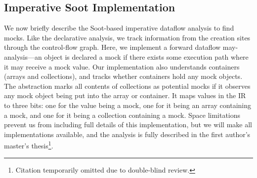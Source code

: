 \subsection{Imperative Soot Implementation}
\label{subsec:soot}
We now briefly describe the Soot-based imperative dataflow analysis to find mocks. Like the declarative analysis, we track information from the creation sites through the control-flow graph. Here, we implement a forward dataflow may-analysis---an object is declared a mock if there exists some execution path where it may receive a mock value. Our implementation also understands containers (arrays and collections), and tracks whether containers hold any mock objects. The abstraction marks all contents of collections as potential mocks if it observes any mock object being put into the array or container. It maps values in the IR to three bits: one for the value being a mock, one for it being an array containing a mock, and one for it being a collection containing a mock. %
Space limitations prevent us from including full details of this implementation, but we will make all implementations available, and the analysis is fully described in the first author's master's thesis\footnote{Citation temporarily omitted due to double-blind review.}.






